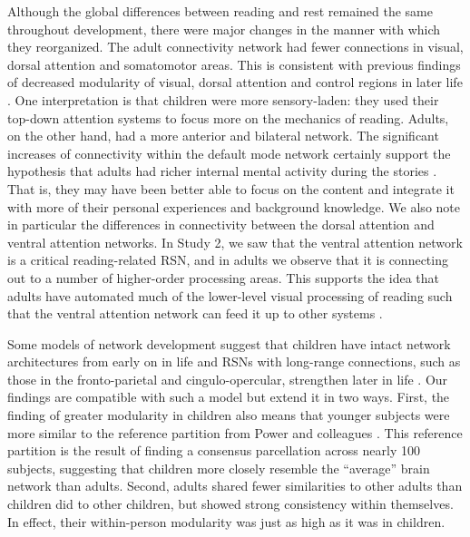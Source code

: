 Although the global differences between reading and rest remained the same throughout development, there were major changes in the manner with which they reorganized. The adult connectivity network had fewer connections in visual, dorsal attention and somatomotor areas. This is consistent with previous findings of decreased modularity of visual, dorsal attention and control regions in later life \citep{Betzel2014}.  One interpretation is that children were more sensory-laden: they used their top-down attention systems to focus more on the mechanics of reading. Adults, on the other hand, had a more anterior and bilateral network. The significant increases of connectivity within the default mode network certainly support the hypothesis that adults had richer internal mental activity during the stories \citep{Spreng2013}. That is, they may have been better able to focus on the content and integrate it with more of their personal experiences and background knowledge. We also note in particular the differences in connectivity between the dorsal attention and ventral attention networks. In Study 2, we saw that the ventral attention network is a critical reading-related RSN, and in adults we observe that it is connecting out to a number of higher-order processing areas. This supports the idea that adults have automated much of the lower-level visual processing of reading such that the ventral attention network can feed it up to other systems \citep{Twomey2011}.

Some models of network development suggest that children have intact network architectures from early on in life and RSNs with long-range connections, such as those in the fronto-parietal and cingulo-opercular, strengthen later in life \citep{Uddin2010, Cao2016}. Our findings are compatible with such a model but extend it in two ways. First, the finding of greater modularity in children also means that younger subjects were more similar to the reference partition from Power and colleagues \citep{Power2011}. This reference partition is the result of finding a consensus parcellation across nearly 100 subjects, suggesting that children more closely resemble the ``average'' brain network than adults. Second, adults shared fewer similarities to other adults than children did to other children, but showed strong consistency within themselves. In effect, their within-person modularity was just as high as it was in children.

